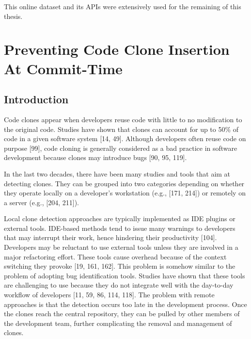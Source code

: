 \documentclass[12pt]{report}
\begin{document}
This online dataset and its APIs were extensively used for the remaining
of this thesis.

\chapter{Preventing Code Clone Insertion At
Commit-Time}\label{preventing-code-clone-insertion-at-commit-time}

\section{Introduction}\label{introduction-2}

Code clones appear when developers reuse code with little to no
modification to the original code. Studies have shown that clones can
account for up to 50\% of code in a given software system {[}14, 49{]}.
Although developers often reuse code on purpose {[}99{]}, code cloning
is generally considered as a bad practice in software development
because clones may introduce bugs {[}90, 95, 119{]}.

In the last two decades, there have been many studies and tools that aim
at detecting clones. They can be grouped into two categories depending
on whether they operate locally on a developer's workstation (e.g.,
{[}171, 214{]}) or remotely on a server (e.g., {[}204, 211{]}).

Local clone detection approaches are typically implemented as IDE
plugins or external tools. IDE-based methods tend to issue many warnings
to developers that may interrupt their work, hence hindering their
productivity {[}104{]}. Developers may be reluctant to use external
tools unless they are involved in a major refactoring effort. These
tools cause overhead because of the context switching they provoke
{[}19, 161, 162{]}. This problem is somehow similar to the problem of
adopting bug identification tools. Studies have shown that these tools
are challenging to use because they do not integrate well with the
day-to-day workflow of developers {[}11, 59, 86, 114, 118{]}. The
problem with remote approaches is that the detection occurs too late in
the development process. Once the clones reach the central repository,
they can be pulled by other members of the development team, further
complicating the removal and management of clones.
\end{document}
